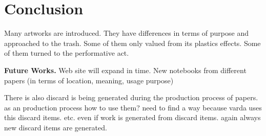 \chapter{Conclusion}

Many artworks are introduced. They have differences in terms of purpose and approached to the trash. Some of them only valued from its plastics effects. Some of them turned to the performative act.

\textbf{Future Works.} Web site will expand in time. New notebooks from different papers (in terms of location, meaning, usage purpose)

There is also discard is being generated during the production process of papers. as an production process how to use them? need to find a way because varda uses this discard items. etc. even if work is generated from discard items. again always new discard items are generated.





